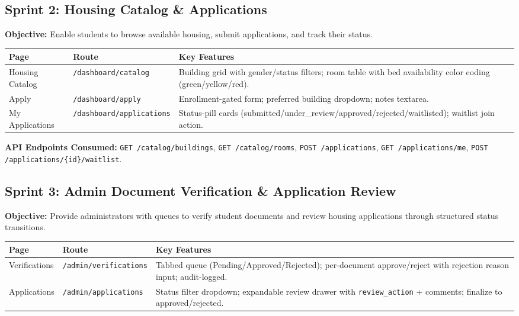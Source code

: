 \documentclass[12pt,a4paper]{article}
\begin{document}
\subsection{Sprint 2: Housing Catalog \& Applications}

\textbf{Objective:} Enable students to browse available housing, submit applications, and track their status.

\begin{longtable}{p{3.5cm}p{3.5cm}p{6cm}}
\toprule
\textbf{Page} & \textbf{Route} & \textbf{Key Features} \\
\midrule
Housing Catalog & \texttt{/dashboard/catalog} & Building grid with gender/status filters; room table with bed availability color coding (green/yellow/red). \\
Apply & \texttt{/dashboard/apply} & Enrollment-gated form; preferred building dropdown; notes textarea. \\
My Applications & \texttt{/dashboard/applications} & Status-pill cards (submitted/under\_review/approved/rejected/waitlisted); waitlist join action. \\
\bottomrule
\end{longtable}

\textbf{API Endpoints Consumed:} \texttt{GET /catalog/buildings}, \texttt{GET /catalog/rooms}, \texttt{POST /applications}, \texttt{GET /applications/me}, \texttt{POST /applications/\{id\}/waitlist}.


\subsection{Sprint 3: Admin Document Verification \& Application Review}

\textbf{Objective:} Provide administrators with queues to verify student documents and review housing applications through structured status transitions.

\begin{longtable}{p{3.5cm}p{3.5cm}p{6cm}}
\toprule
\textbf{Page} & \textbf{Route} & \textbf{Key Features} \\
\midrule
Verifications & \texttt{/admin/verifications} & Tabbed queue (Pending/Approved/Rejected); per-document approve/reject with rejection reason input; audit-logged. \\
Applications & \texttt{/admin/applications} & Status filter dropdown; expandable review drawer with \texttt{review\_action} + comments; finalize to approved/rejected. \\
\bottomrule
\end{longtable}
\end{document}
